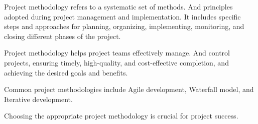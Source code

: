 Project methodology refers to a systematic set of methods.
And principles adopted during project management and implementation.
It includes specific steps and approaches 
for planning, organizing, implementing, monitoring, 
and closing different phases of the project.

Project methodology helps project teams effectively manage.
And control projects, ensuring timely, high-quality, 
and cost-effective completion, and achieving the desired goals and benefits. 

Common project methodologies 
include Agile development, Waterfall model, and Iterative development.

Choosing the appropriate project methodology is crucial for project success.
